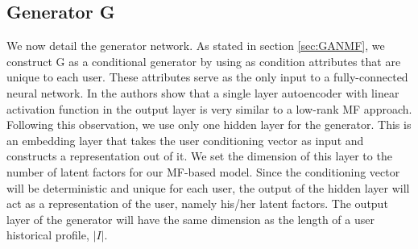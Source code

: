 \subsection{Generator G}
\label{sec:GANMF_G}
We now detail the generator network. As stated in section \ref{sec:GANMF}, we construct G as a conditional generator by using as condition attributes that are unique to each user. These attributes serve as the only input to a fully-connected neural network. In \cite{strub2016hybrid} the authors show that a single layer autoencoder with linear activation function in the output layer is very similar to a low-rank MF approach. Following this observation, we use only one hidden layer for the generator. This is an embedding layer that takes the user conditioning vector as input and constructs a representation out of it. We set the dimension of this layer to the number of latent factors for our MF-based model. Since the conditioning vector will be deterministic and unique for each user, the output of the hidden layer will act as a representation of the user, namely his/her latent factors. The output layer of the generator will have the same dimension as the length of a user historical profile, $|I|$. 

